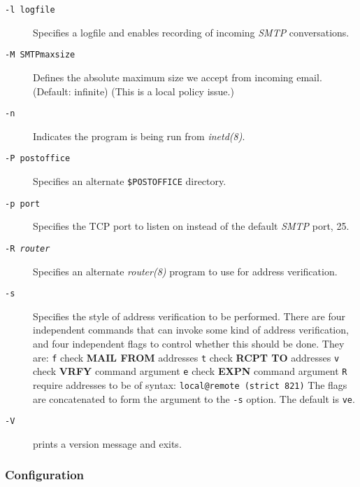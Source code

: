 \begin{description}
\item[{\tt -l logfile}] \mbox{}

Specifies a logfile and enables recording of incoming {\em SMTP\/} conversations.

\item[{\tt -M SMTPmaxsize}] \mbox{}

Defines the absolute maximum size we accept from incoming email. 
(Default: infinite) (This is a local policy issue.)

\item[{\tt -n}] \mbox{}

Indicates the program is being run from {\em inetd(8)\/}.

\item[{\tt -P postoffice}] \mbox{}

Specifies an alternate {\tt \$POSTOFFICE} directory.

\item[{\tt -p port}] \mbox{}

Specifies the TCP port to listen on instead of the default {\em SMTP\/} port, 25.

\item[{\tt -R {\em router\/}}] \mbox{}

Specifies an alternate {\em router(8)\/} program to use for address verification.

\item[{\tt -s}] \mbox{}

Specifies the style of address verification to be performed. There are four independent commands 
that can invoke some kind of address verification, and four independent flags to control whether this should be done. 
They are:
{\tt f} check {\bf MAIL FROM} addresses
{\tt t} check {\bf RCPT TO} addresses
{\tt v} check {\bf VRFY} command argument
{\tt e} check {\bf EXPN} command argument
{\tt R} require addresses to be of syntax: {\tt local@remote (strict 821)}
The flags are concatenated to form the argument to the {\tt -s} option. 
The default is {\tt ve}.

\item[{\tt -V}] \mbox{}

prints a version message and exits.

\end{description}





\subsubsection{Configuration}



